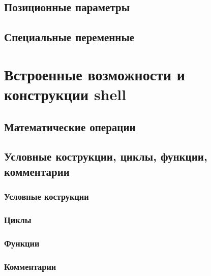 \documentclass[oneside]{book}
\begin{document}
		\section{Позиционные параметры}
		
		
		\section{Специальные переменные}
		
		
	\chapter{Встроенные возможности и конструкции shell}
	

		\section{Математические операции}
		
			
		\section{Условные кострукции, циклы, функции, комментарии}
		
		
			\subsection{Условные кострукции}
			
			
			\subsection{Циклы}
			
			
			\subsection{Функции}
			
			
			\subsection{Комментарии}
			
			
\end{document}
